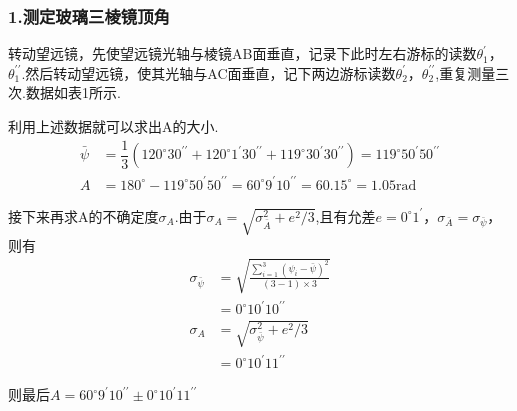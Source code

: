 \documentclass[12pt,a4paper,UTF8]{ctexart}
\begin{document}
\subsubsection*{1.测定玻璃三棱镜顶角}
转动望远镜，先使望远镜光轴与棱镜AB面垂直，记录下此时左右游标的读数$\theta_1^{\prime}$，$\theta_1^{\prime \prime}$.然后转动望远镜，使其光轴与AC面垂直，记下两边游标读数$\theta_2^{\prime}$，$\theta_2^{\prime \prime}$,重复测量三次.数据如表1所示.
\begin{table}[htbp]
\centering
\caption{测定玻璃三棱镜顶角数据表}
\end{table}
\par
利用上述数据就可以求出A的大小.
\begin{align*}
\bar\psi&=\dfrac{1}{3}(120^{\circ}30^{\prime \prime}+120^{\circ}1^{\prime}30^{\prime \prime}+119^{\circ}30^{\prime}30^{\prime \prime})=119^{\circ}50^{\prime}50^{\prime \prime} \\
A&=180^{\circ}-119^{\circ}50^{\prime}50^{\prime \prime} =60^{\circ}9^{\prime}10^{\prime \prime} =60.15^{\circ} =1.05\mathrm{rad}
\end{align*}
\par
接下来再求A的不确定度$\sigma_A$.由于$\sigma_A=\sqrt{\sigma_{\bar A}^2+e^2/3}$,且有允差$e=0^{\circ}1^{\prime}$，$\sigma_{\bar A}=\sigma_{\bar \psi}$，则有
\begin{align*}
\sigma_{\bar \psi}&=\sqrt{\frac{\sum_{i=1}^3(\psi_i-\bar \psi)^2}{(3-1)\times3}} \\
&=0^{\circ}10^{\prime}10^{\prime \prime} \\
\sigma_A&=\sqrt{\sigma_{\bar\psi}^2+e^2/3} \\
&=0^{\circ}10^{\prime}11^{\prime \prime}
\end{align*}
\par
则最后$A=60^{\circ}9^{\prime}10^{\prime \prime}\pm0^{\circ}10^{\prime}11^{\prime \prime}$
\end{document}
